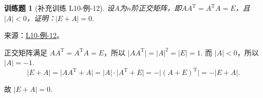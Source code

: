 \documentclass[12pt,fontset=fandol]{ctexart}
\newtheorem{exercise}{训练题}[section]
\begin{document}
\begin{exercise}[补充训练 L10-例-12]\label{prob:L10-例-12}
设$A$为$n$阶正交矩阵，即$AA^\mathrm{T}=A^\mathrm{T}A=E$，且$|A|<0$，证明：$|E+A|=0$.
\end{exercise}
\noindent 来源：\href{https://github.com/yhwu-is/Linear-Algebra-Left-Undone/blob/new/%E8%AE%B2%E4%B9%89/%E4%B8%93%E9%A2%98/10%20%E8%A1%8C%E5%88%97%E5%BC%8F.tex}{L10-例-12}。
\begin{solve}
正交矩阵满足 $AA^{\mathrm{T}} = A^{\mathrm{T}}A = E$，所以 $\lvert AA^{\mathrm{T}} \rvert = \lvert A \rvert^2 = \lvert E \rvert = 1$. 而 $\lvert A \rvert < 0$，所以 $\lvert A \rvert = -1$.
    \[
        \lvert E+A \rvert = \lvert AA^{\mathrm{T}}+A \rvert = \lvert A \rvert \cdot \lvert A^{\mathrm{T}}+E \rvert = -\lvert (A+E)^{\mathrm{T}} \rvert = -\lvert E+A \rvert.
    \]

    故 $\lvert E+A \rvert = 0$.
\end{solve}
\end{document}
